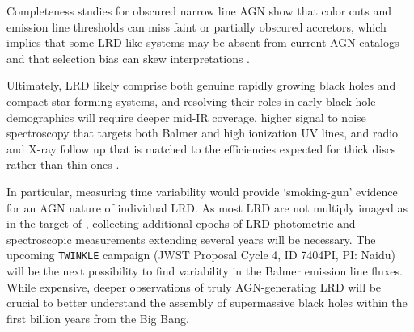 \documentclass[utf8]{FrontiersinHarvard} %
\begin{document}
Completeness studies for obscured narrow line AGN show that color cuts and emission line thresholds can miss faint or partially obscured accretors, which implies that some LRD-like systems may be absent from current AGN catalogs and that selection bias can skew interpretations \citep{bouwens2025beneath,scholtz2025jades}. 

Ultimately, LRD likely comprise both genuine rapidly growing black holes and compact star-forming systems, and resolving their roles in early black hole demographics will require deeper mid-IR coverage, higher signal to noise spectroscopy that targets both Balmer and high ionization UV lines, and radio and X-ray follow up that is matched to the efficiencies expected for thick discs rather than thin ones \citep{akins2025tentative}.

In particular, measuring time variability would provide `smoking-gun' evidence for an AGN nature of individual LRD. As most LRD are not multiply imaged as in the target of \citet{furtak2025investigating}, collecting additional epochs of LRD photometric and spectroscopic measurements extending several years will be necessary. The upcoming \texttt{TWINKLE} campaign (JWST Proposal Cycle 4, ID 7404PI, PI: Naidu) will be the next possibility to find variability in the Balmer emission line fluxes.
While expensive, deeper observations of truly AGN-generating LRD will be crucial to better understand the assembly of supermassive black holes within the first billion years from the Big Bang.

\end{document}
